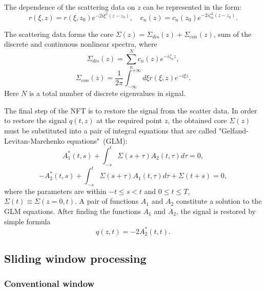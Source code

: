 The dependence of the scattering data on $z$ can be represented in the form:
\begin{equation}
    r(\xi,z) = r(\xi,z_0) e^{-2i \xi^2 (z - z_0)} {,} \quad 
    c_n(z) = c_n(z_0) e^{-2i \zeta_n^2 (z - z_0)} {.}
\end{equation}

The scattering data forms the core $ \Sigma (z) = \Sigma_{dis} (z) + \Sigma_{con} (z) $, sum of the discrete and continuous nonlinear spectra, where
\begin{equation}
    \Sigma_{dis}(z) = \sum_{n}^{N} c_n(z) e^{-i \zeta_n z} {,}
    \label{eq:kernel_sol}
\end{equation}
\begin{equation}
    \Sigma_{con}(z) = \frac{1}{2\pi} \int_{-\infty}^{+\infty} d\xi r(\xi, z) e^{-i \xi z} {.}
    \label{eq:kernel_rad}
\end{equation}
Here $N$ is a total number of discrete eigenvalues in signal.

The final step of the NFT is to restore the signal from the scatter data. In order to restore the signal $q (t, z)$ at the required point $z$, the obtained core $\Sigma (z)$ must be substituted into a pair of integral equations that are called "Gelfand-Levitan-Marchenko equations"\ (GLM):
\begin{equation}
    A_1^{*}(t,s)+\int_{-s}^{t} \Sigma(s+\tau) A_2(t,\tau) d\tau = 0 {,}
    \label{eq:glm_1}
\end{equation}
\begin{equation}
    -A_2^{*}(t,s)+\int_{-s}^{t} \Sigma(s+\tau) A_1(t,\tau) d\tau + \Sigma(t+s) = 0 {,}
    \label{eq:glm_2}
\end{equation}
where the parameters are within $ -t \le s <t $ and $ 0 \le t \le T $, $ \Sigma (t) \equiv \Sigma (z = 0, t) $. A pair of functions $A_1$ and $A_2$ constitute a solution to the GLM equations. After finding the functions $A_1$ and $ A_2 $, the signal is restored by
simple formula
\begin{equation}
    q(z,t)= -2 A_2^{*}(t,t) {.}
    \label{eq:glm_q}
\end{equation}



\subsection{Sliding window processing}
\subsubsection{Conventional window}

